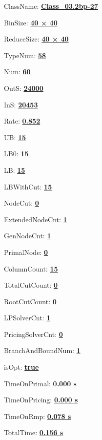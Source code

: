 \documentclass[11pt]{article}
\begin{document}
\pagestyle{empty}


ClassName: \underline{\textbf{Class_03.2bp-27}}
\par
BinSize: \underline{\textbf{40 × 40}}
\par
ReduceSize: \underline{\textbf{40 × 40}}
\par
TypeNum: \underline{\textbf{58}}
\par
Num: \underline{\textbf{60}}
\par
OutS: \underline{\textbf{24000}}
\par
InS: \underline{\textbf{20453}}
\par
Rate: \underline{\textbf{0.852}}
\par
UB: \underline{\textbf{15}}
\par
LB0: \underline{\textbf{15}}
\par
LB: \underline{\textbf{15}}
\par
LBWithCut: \underline{\textbf{15}}
\par
NodeCut: \underline{\textbf{0}}
\par
ExtendedNodeCnt: \underline{\textbf{1}}
\par
GenNodeCnt: \underline{\textbf{1}}
\par
PrimalNode: \underline{\textbf{0}}
\par
ColumnCount: \underline{\textbf{15}}
\par
TotalCutCount: \underline{\textbf{0}}
\par
RootCutCount: \underline{\textbf{0}}
\par
LPSolverCnt: \underline{\textbf{1}}
\par
PricingSolverCnt: \underline{\textbf{0}}
\par
BranchAndBoundNum: \underline{\textbf{1}}
\par
isOpt: \underline{\textbf{true}}
\par
TimeOnPrimal: \underline{\textbf{0.000 s}}
\par
TimeOnPricing: \underline{\textbf{0.000 s}}
\par
TimeOnRmp: \underline{\textbf{0.078 s}}
\par
TotalTime: \underline{\textbf{0.156 s}}
\par
\newpage


\end{document}
